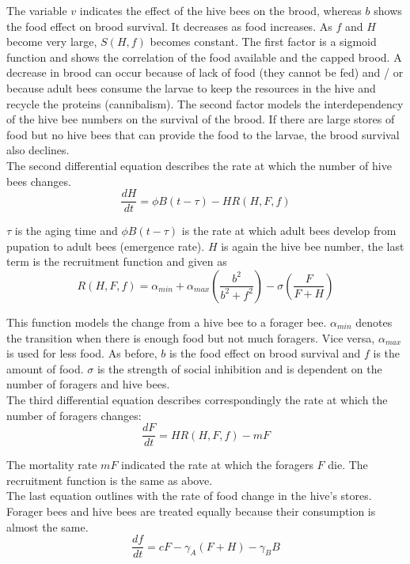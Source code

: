 	The variable $v$ indicates the effect of the hive bees on the brood, whereas $b$ shows the food effect on brood survival. It decreases as food increases. As $f$ and $H$ become very large, $S(H,f)$ becomes constant. The first factor is a sigmoid function and shows the correlation of the food available and the capped brood. A decrease in brood can occur because of lack of food (they cannot be fed) and / or because adult bees consume the larvae to keep the resources in the hive and recycle the proteins (cannibalism). The second factor models the interdependency of the hive bee numbers on the survival of the brood. If there are large stores of food but no hive bees that can provide the food to the larvae, the brood survival also declines.  
	\\
	The second differential equation describes the rate at which the number of hive bees changes.	
	\begin{equation}\label{eq:changeHiveBees}
		\frac{dH}{dt}=\phi B(t-\tau)-HR(H,F,f)
	\end{equation}
	
	$\tau$ is the aging time and $\phi B(t-\tau)$ is the rate at which adult bees develop from pupation to adult bees (emergence rate). $H$ is again the hive bee number, the last term is the recruitment function and given as		
		\begin{equation}\label{eq:recruitmentFunction}
			R(H,F,f) = \alpha_{min} + \alpha_{max}(\frac{b^2}{b^2+f^2})-\sigma(\frac{F}{F+H})
		\end{equation}
				
	This function models the change from a hive bee to a forager bee. $\alpha_{min}$ denotes the transition when there is enough food but not much foragers. Vice versa, $\alpha_{max}$ is used for less food. As before, $b$ is the food effect on brood survival and $f$ is the amount of food. $\sigma$ is the strength of social inhibition and is dependent on the number of foragers and hive bees.\\
	The third differential equation describes correspondingly the rate at which the number of foragers changes:	
	\begin{equation}\label{eq:changeForagers}
		\frac{dF}{dt} = HR(H,F,f)-m F
	\end{equation}
	
	The mortality rate $mF$ indicated the rate at which the foragers $F$ die. The recruitment function is the same as above.\\	
	The last equation outlines with the rate of food change in the hive's stores. Forager bees and hive bees are treated equally because their consumption is almost the same. 	
	\begin{equation}\label{eq:changeFoodStoreConst}
		\frac{df}{dt} = c F - \gamma_A (F+H) - \gamma_B B
	\end{equation}
	
